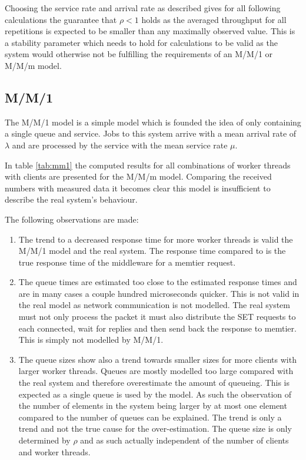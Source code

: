     Choosing the service rate and arrival rate as described gives for all following calculations the guarantee that
    $\rho < 1$ holds as the averaged throughput for all repetitions is expected to be smaller than any maximally
    observed value. This is a stability parameter which needs to hold for calculations to be valid as the system would
    otherwise not be fulfilling the requirements of an M/M/1 or M/M/m model.

    \subsection{M/M/1\label{subsec:7_mm1}}
        The M/M/1 model is a simple model which is founded the idea of only containing a single queue and service. Jobs to
        this system arrive with a mean arrival rate of $\lambda$ and are processed by the service with the mean service
        rate $\mu$.

        In table \ref{tab:mm1} the computed results for all combinations of worker threads with clients are presented
        for the M/M/m model. Comparing the received numbers with measured data it becomes clear this model is
        insufficient to describe the real system's behaviour.

        The following observations are made:

        \begin{enumerate}
            \item The trend to a decreased response time for more worker threads is valid the M/M/1 model and the real
                  system. The response time compared to is the true response time of the middleware for a memtier
                  request.
            \item The queue times are estimated too close to the estimated response times and are in many cases a couple
                  hundred microseconds quicker. This is not valid in the real model as network communication is not
                  modelled. The real system must not only process the packet it must also distribute the SET requests to
                  each \srv{} connected, wait for replies and then send back the response to memtier. This is simply not
                  modelled by M/M/1.
            \item The queue sizes show also a trend towards smaller sizes for more clients with larger worker threads.
                  Queues are mostly modelled too large compared with the real system and therefore overestimate the
                  amount of queueing. This is expected as a single queue is used by the model. As such the observation
                  of the number of elements in the system being larger by at most one element compared to the number of
                  queues can be explained.\newline
                  The trend is only a trend and not the true cause for the over-estimation. The queue size is only
                  determined by $\rho$ and as such actually independent of the number of clients and worker threads.
        \end{enumerate}

